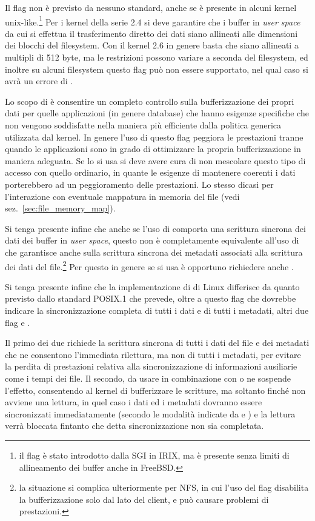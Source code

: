 Il flag  non è previsto da nessuno standard, anche se è
presente in alcuni kernel unix-like.\footnote{il flag è stato introdotto dalla
  SGI in IRIX, ma è presente senza limiti di allineamento dei buffer anche in
  FreeBSD.} Per i kernel della serie 2.4 si deve garantire che i buffer in
\textit{user space} da cui si effettua il trasferimento diretto dei dati siano
allineati alle dimensioni dei blocchi del filesystem. Con il kernel 2.6 in
genere basta che siano allineati a multipli di 512 byte, ma le restrizioni
possono variare a seconda del filesystem, ed inoltre su alcuni filesystem
questo flag può non essere supportato, nel qual caso si avrà un errore di
.

Lo scopo di  è consentire un completo controllo sulla
bufferizzazione dei propri dati per quelle applicazioni (in genere database)
che hanno esigenze specifiche che non vengono soddisfatte nella maniera più
efficiente dalla politica generica utilizzata dal kernel. In genere l'uso di
questo flag peggiora le prestazioni tranne quando le applicazioni sono in
grado di ottimizzare la propria bufferizzazione in maniera adeguata. Se lo si
usa si deve avere cura di non mescolare questo tipo di accesso con quello
ordinario, in quante le esigenze di mantenere coerenti i dati porterebbero ad
un peggioramento delle prestazioni. Lo stesso dicasi per l'interazione con
eventuale mappatura in memoria del file (vedi sez.~\ref{sec:file_memory_map}).

Si tenga presente infine che anche se l'uso di  comporta una
scrittura sincrona dei dati dei buffer in \textit{user space}, questo non è
completamente equivalente all'uso di  che garantisce anche
sulla scrittura sincrona dei metadati associati alla scrittura dei dati del
file.\footnote{la situazione si complica ulteriormente per NFS, in cui l'uso
  del flag disabilita la bufferizzazione solo dal lato del client, e può
  causare problemi di prestazioni.} Per questo in genere se si usa
 è opportuno richiedere anche .

Si tenga presente infine che la implementazione di  di Linux
differisce da quanto previsto dallo standard POSIX.1 che prevede, oltre a
questo flag che dovrebbe indicare la sincronizzazione completa di tutti i dati
e di tutti i metadati, altri due flag  e . 

Il primo dei due richiede la scrittura sincrona di tutti i dati del file e dei
metadati che ne consentono l'immediata rilettura, ma non di tutti i metadati,
per evitare la perdita di prestazioni relativa alla sincronizzazione di
informazioni ausiliarie come i tempi dei file.  Il secondo, da usare in
combinazione con  o  ne sospende l'effetto,
consentendo al kernel di bufferizzare le scritture, ma soltanto finché non
avviene una lettura, in quel caso i dati ed i metadati dovranno essere
sincronizzati immediatamente (secondo le modalità indicate da 
e ) e la lettura verrà bloccata fintanto che detta
sincronizzazione non sia completata.

